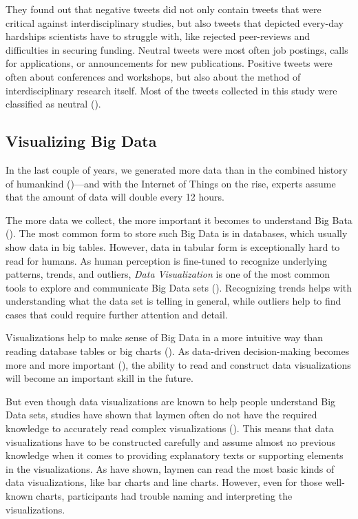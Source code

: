 They found out that negative tweets did not only contain tweets that were critical against interdisciplinary studies, but also tweets that depicted every-day hardships scientists have to struggle with, like rejected peer-reviews and difficulties in securing funding. Neutral tweets were most often job postings, calls for applications, or announcements for new publications. Positive tweets were often about conferences and workshops, but also about the method of interdisciplinary research itself. Most of the tweets collected in this study were classified as neutral (\cite[7]{weberInterdisciplinaryOptimismSentiment2019}).


\subsection{Visualizing Big Data}
In the last couple of years, we generated more data than in the combined history of humankind (\cite{helbing2019will})---and with the Internet of Things on the rise, experts assume that the amount of data will double every 12 hours.

The more data we collect, the more important it becomes to understand Big Bata (\cite{bornerDataVisualizationLiteracy2019}). The most common form to store such Big Data is in databases, which usually show data in big tables. However, data in tabular form is exceptionally hard to read for humans. As human perception is fine-tuned to recognize underlying patterns, trends, and outliers, \emph{Data Visualization} is one of the most common tools to explore and communicate Big Data sets (\cite{heerTourVisualizationZoo2010}). Recognizing trends helps with understanding what the data set is telling in general, while outliers help to find cases that could require further attention and detail.

Visualizations help to make sense of Big Data in a more intuitive way than reading database tables or big charts (\cite{donalekImmersiveCollaborativeData2014}). As data-driven decision-making becomes more and more important (\cite{brynjolfssonStrengthNumbersHow2011}), the ability to read and construct data visualizations will become an important skill in the future.

But even though data visualizations are known to help people understand Big Data sets, studies have shown that laymen often do not have the required knowledge to accurately read complex visualizations (\cite{bornerInvestigatingAspectsData2016}). This means that data visualizations have to be constructed carefully and assume almost no previous knowledge when it comes to providing explanatory texts or supporting elements in the visualizations. As \citeauthor{bornerInvestigatingAspectsData2016} have shown, laymen can read the most basic kinds of data visualizations, like bar charts and line charts. However, even for those well-known charts, participants had trouble naming and interpreting the visualizations.

